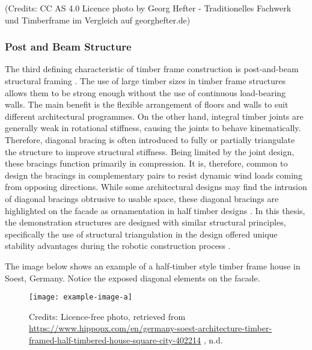 (Credits: CC AS 4.0 Licence photo by Georg Hefter - Traditionelles Fachwerk und Timberframe im Vergleich auf georghefter.de)

\subsubsection{Post and Beam Structure}
\label{subsubsection:introduction_post_and_beam_structure}

The third defining characteristic of timber frame construction is post-and-beam structural framing \parencite{jacksobonHistoricAmericanTimber2014,sobonTimberFrameConstruction1984}. The use of large timber sizes in timber frame structures allows them to be strong enough without the use of continuous load-bearing walls. The main benefit is the flexible arrangement of floors and walls to suit different architectural programmes. 
On the other hand, integral timber joints are generally weak in rotational stiffness, causing the joints to behave kinematically. Therefore, diagonal bracing is often introduced to fully or partially triangulate the structure to improve structural stiffness. Being limited by the joint design, these bracings function primarily in compression. It is, therefore, common to design the bracings in complementary pairs to resist dynamic wind loads coming from opposing directions. While some architectural designs may find the intrusion of diagonal bracings obtrusive to usable space, these diagonal bracings are highlighted on the facade as ornamentation in half timber designs \parencite{gernerFachwerkEntwicklungGefuege1979}. In this thesis, the demonstration structures are designed with similar structural principles, specifically the use of structural triangulation in the design offered unique stability advantages during the robotic construction process  .

The image below shows an example of a half-timber style timber frame house in Soest, Germany. Notice the exposed diagonal elements on the facade.

\begin{figure}[ht]
    \texttt{[image: example-image-a]}
    \caption{
        Credits: Licence-free photo, retrieved from \url{https://www.hippopx.com/en/germany-soest-architecture-timber-framed-half-timbered-house-square-city-402214} , n.d.}
\end{figure}
    
